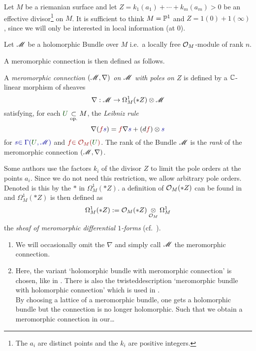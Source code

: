 Let $M$ be a riemanian surface and let $Z=k_1(a_1)+\cdots+k_m(a_m)>0$ be an
effective divisor\footnote{The $a_i$ are distinct points and the $k_i$ are
positive integers.} on $M$.
It is sufficient to think $M=\P^1$ and $Z=1(0)+1(\infty)$\TODO[\infty?], since
we will only be interested in local information (at $0$).

Let $\sM$ be a holomorphic Bundle over $M$ i.e.\ a locally free $\cO_M$-module
of rank $n$.

A meromorphic connection is then defined as follows.
\begin{defn}\label{defn:mercon}
  \def\myU{\textcolor{green!30!black}{U}}
  \def\mys{\textcolor{blue!60!black}{s}}
  \def\myf{\textcolor{red!60!black}{f}}
  A \emph{meromorphic connection $(\sM,\nabla)$ on $\sM$ with poles on $Z$}
  is defined by a $\C$-linear morphism of sheaves
  \[
    \nabla:\sM\to\Omega_M^1(*Z)\otimes\sM
  \]
  satisfying, for each $\myU\underset{\text{op.}}{\subset} M$, the
  \emph{Leibniz rule}
    \[
      \nabla(\myf\mys)=\myf\nabla\mys+(d\myf)\otimes\mys
    \]
  for $\mys\textcolor{blue!60!black}{\in\Gamma(\myU,\sM)}$ and
  $\myf\textcolor{red!60!black}{\in\cO_M(\myU)}$.
  The rank of the Bundle $\sM$ is the \emph{rank} of the meromorphic connection
  $(\sM,\nabla)$.
  \begin{s-rem}
    Some authors use the factors $k_i$ of the divisor $Z$ to limit the pole
    orders at the points $a_i$. Since we do not need this restriction, we allow
    arbitrary pole orders. Denoted is this by the $*$ in $\Omega_M^1(*Z)$.
    a definition of $\cO_M(*Z)$ can be found
    in~\cite[Sec.0.8]{sabbah2007isomonodromic} and $\Omega_M^1(*Z)$ is then
    defined as
    \[
      \Omega_M^1(*Z):=\cO_M(*Z)\underset{\cO_M}\otimes\Omega_M^1
    \]
    the \emph{sheaf of meromorphic differential $1$-forms} (cf.\
    \cite[Sec.0.9.b]{sabbah2007isomonodromic}).
  \end{s-rem}
\end{defn}
\begin{rem}
  \begin{enumerate}
    \item We will occasionally omit the $\nabla$ and simply call $\sM$ the
      meromorphic connection.
    \item Here, the variant `holomorphic bundle with meromorphic connection' is
      chosen, like in \cite{boalch}.
      There is also the twisted description `meromorphic
      bundle with holomorphic connection' which is used in
      \cite{sabbah2007isomonodromic}.
      \\ By choosing a lattice of a meromorphic bundle, one gets a holomorphic
      bundle but the connection is no longer holomorphic. Such that we obtain a
      meromorphic connection in our\dots\TODO
  \end{enumerate}
\end{rem}

